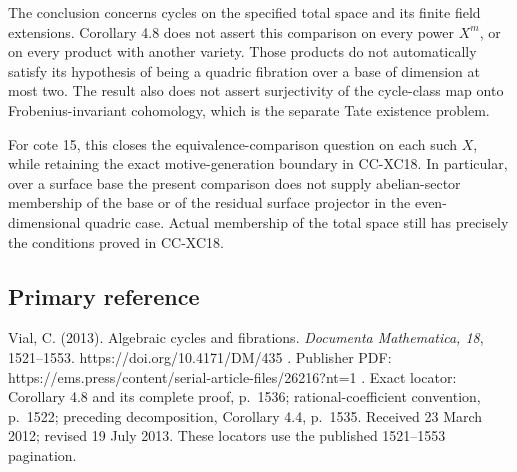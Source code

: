 The conclusion concerns cycles on the specified total space and its
finite field extensions. Corollary 4.8 does not assert this comparison
on every power \(X^m\), or on every product with another variety. Those
products do not automatically satisfy its hypothesis of being a quadric
fibration over a base of dimension at most two. The result also does not
assert surjectivity of the cycle-class map onto Frobenius-invariant
cohomology, which is the separate Tate existence problem.

For cote 15, this closes the equivalence-comparison question on each
such \(X\), while retaining the exact motive-generation boundary in
CC-XC18. In particular, over a surface base the present comparison does
not supply abelian-sector membership of the base or of the residual
surface projector in the even-dimensional quadric case. Actual
membership of the total space still has precisely the conditions proved
in CC-XC18.

\subsection{Primary reference}\label{primary-reference}

Vial, C. (2013). Algebraic cycles and fibrations. \emph{Documenta
Mathematica, 18}, 1521--1553. https://doi.org/10.4171/DM/435 . Publisher
PDF: https://ems.press/content/serial-article-files/26216?nt=1 . Exact
locator: Corollary 4.8 and its complete proof, p.~1536;
rational-coefficient convention, p.~1522; preceding decomposition,
Corollary 4.4, p.~1535. Received 23 March 2012; revised 19 July 2013.
These locators use the published 1521--1553 pagination.
